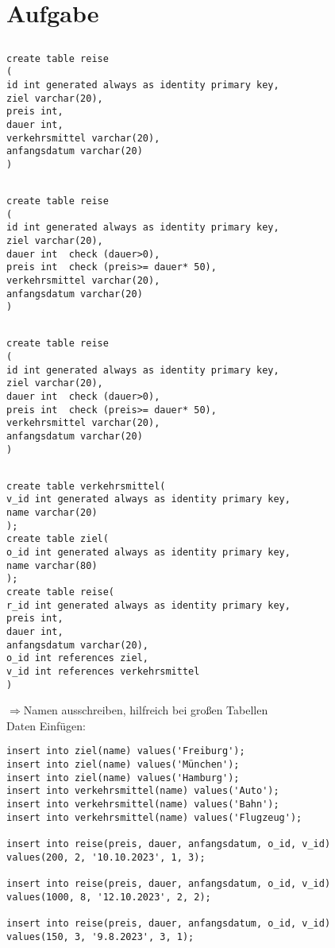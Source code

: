 \documentclass[a4paper,11pt,titlepage]{article}
\begin{document}
\section{Aufgabe}
\subsection{}
\begin{verbatim}
create table reise
(
id int generated always as identity primary key,
ziel varchar(20),
preis int,
dauer int,
verkehrsmittel varchar(20),
anfangsdatum varchar(20)
)
\end{verbatim}
\subsection{}
\begin{verbatim}
create table reise
(
id int generated always as identity primary key,
ziel varchar(20),
dauer int  check (dauer>0),
preis int  check (preis>= dauer* 50),
verkehrsmittel varchar(20),
anfangsdatum varchar(20)
)
\end{verbatim}
\subsection{}
\begin{verbatim}
create table reise
(
id int generated always as identity primary key,
ziel varchar(20),
dauer int  check (dauer>0),
preis int  check (preis>= dauer* 50),
verkehrsmittel varchar(20),
anfangsdatum varchar(20)
)
\end{verbatim}
\subsection{}
\begin{verbatim}
create table verkehrsmittel(
v_id int generated always as identity primary key,
name varchar(20)
);
create table ziel(
o_id int generated always as identity primary key,
name varchar(80)
);
create table reise(
r_id int generated always as identity primary key,
preis int,
dauer int,
anfangsdatum varchar(20),
o_id int references ziel,
v_id int references verkehrsmittel
)
\end{verbatim}
$\Rightarrow$Namen ausschreiben, hilfreich bei großen Tabellen\\
Daten Einfügen:
\begin{verbatim}
insert into ziel(name) values('Freiburg');
insert into ziel(name) values('München');
insert into ziel(name) values('Hamburg');
insert into verkehrsmittel(name) values('Auto');
insert into verkehrsmittel(name) values('Bahn');
insert into verkehrsmittel(name) values('Flugzeug');

insert into reise(preis, dauer, anfangsdatum, o_id, v_id)
values(200, 2, '10.10.2023', 1, 3);

insert into reise(preis, dauer, anfangsdatum, o_id, v_id)
values(1000, 8, '12.10.2023', 2, 2);

insert into reise(preis, dauer, anfangsdatum, o_id, v_id) 
values(150, 3, '9.8.2023', 3, 1);
\end{verbatim}
\end{document}
